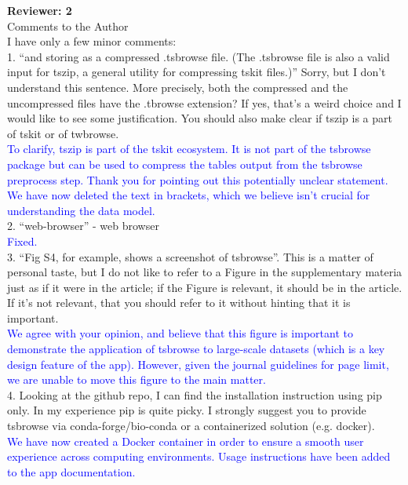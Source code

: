 \documentclass{article}
\begin{document}
\textbf{Reviewer: 2}\\

Comments to the Author\\

I have only a few minor comments:\\
1. ``and storing as a compressed .tsbrowse file. (The .tsbrowse file is also a valid input for
tszip, a general utility for compressing tskit files.)'' Sorry, but I don't understand this sentence. 
More precisely, both the compressed and the uncompressed files have the .tbrowse extension? If yes, 
that's a weird choice and I would like to see some justification. You should also make clear if tszip 
is a part of tskit or of twbrowse.\\
\textcolor{blue}{To clarify, tszip is part of the tskit ecosystem. It is not part of the tsbrowse 
package but can be used to compress the tables output from the tsbrowse preprocess step. Thank you 
for pointing out this potentially unclear statement. We have now deleted the text 
in brackets, which we believe isn't crucial for understanding the data model.}\\

2. ``web-browser'' - web browser\\
\textcolor{blue}{Fixed.}\\

3. ``Fig S4, for example, shows a screenshot of tsbrowse''. This is a matter of personal taste, but I do
not like to refer to a Figure in the supplementary materia just as if it were in the article; if the 
Figure is relevant, it should be in the article. If it's not relevant, that you should refer to it without
hinting that it is important.\\
\textcolor{blue}{We agree with your opinion, and believe that this figure is important 
to demonstrate the application of tsbrowse to large-scale datasets (which is a key design 
feature of the app). However, given the journal guidelines for page limit, we are unable 
to move this figure to the main matter.}\\

4. Looking at the github repo, I can find the installation instruction using pip only. In my experience 
pip is quite picky. I strongly suggest you to provide tsbrowse via conda-forge/bio-conda or a containerized 
solution (e.g. docker).\\
\textcolor{blue}{We have now created a Docker container in order to ensure a smooth user experience across 
computing environments. Usage instructions have been added to the app documentation.}\\
\end{document}
